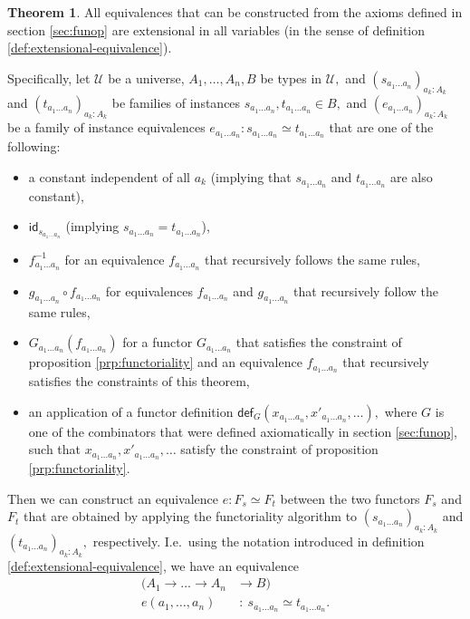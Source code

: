 \documentclass[a4paper]{article}
\theoremstyle{definition}
\newtheorem{theorem}[definition]{Theorem}
\theoremstyle{remark}
\renewcommand{\equiv}{\simeq}
\newcommand{\U}{\mathcal{U}}
\newcommand{\nm}{\mathsf}
\newcommand{\id}{\nm{id}}
\newcommand{\fndef}[1]{\nm{def}_{#1}}
\begin{document}
\begin{theorem}
  \label{thm:extensionality}
  All equivalences that can be constructed from the axioms defined in section \ref{sec:funop}
  are extensional in all variables (in the sense of definition \ref{def:extensional-equivalence}).

  Specifically, let $\U$ be a universe, $A_1,\ldots,A_n,B$ be types in $\U,$ and
  $(s_{a_1 \ldots a_n})_{a_k : A_k}$ and $(t_{a_1 \ldots a_n})_{a_k : A_k}$ be families
  of instances $s_{a_1 \ldots a_n},t_{a_1 \ldots a_n} \in B,$ and
  $(e_{a_1 \ldots a_n})_{a_k : A_k}$ be a family of instance equivalences
  $e_{a_1 \ldots a_n} : s_{a_1 \ldots a_n} \equiv t_{a_1 \ldots a_n}$ that are one of the
  following:
  \begin{itemize}
    \item a constant independent of all $a_k$ (implying that $s_{a_1 \ldots a_n}$ and
    $t_{a_1 \ldots a_n}$ are also constant),
    \item $\id_{s_{a_1 \ldots a_n}}$ (implying $s_{a_1 \ldots a_n} = t_{a_1 \ldots a_n}$),
    \item $f_{a_1 \ldots a_n}^{-1}$ for an equivalence $f_{a_1 \ldots a_n}$ that recursively
    follows the same rules,
    \item $g_{a_1 \ldots a_n} \circ f_{a_1 \ldots a_n}$ for equivalences $f_{a_1 \ldots a_n}$
    and $g_{a_1 \ldots a_n}$ that recursively follow the same rules,
    \item $G_{a_1 \ldots a_n}(f_{a_1 \ldots a_n})$ for a functor $G_{a_1 \ldots a_n}$ that
    satisfies the constraint of proposition \ref{prp:functoriality} and an equivalence
    $f_{a_1 \ldots a_n}$ that recursively satisfies the constraints of this theorem,
    \item an application of a functor definition
    $\fndef{G}(x_{a_1 \ldots a_n},x'_{a_1 \ldots a_n},\ldots),$ where $G$ is one of the
    combinators that were defined axiomatically in section \ref{sec:funop}, such that
    $x_{a_1 \ldots a_n},x'_{a_1 \ldots a_n},\ldots$ satisfy the constraint of proposition
    \ref{prp:functoriality}.
  \end{itemize}

  Then we can construct an equivalence $e : F_s \equiv F_t$ between the two functors $F_s$
  and $F_t$ that are obtained by applying the functoriality algorithm to
  $(s_{a_1 \ldots a_n})_{a_k : A_k}$ and $(t_{a_1 \ldots a_n})_{a_k : A_k},$ respectively.
  I.e.\ using the notation introduced in definition \ref{def:extensional-equivalence}, we
  have an equivalence
  \begin{align*}
    (A_1 \to \dots \to A_n &\to   B)\\
    e(a_1,\ldots,a_n)      &\ :\  s_{a_1 \ldots a_n} \equiv t_{a_1 \ldots a_n}.
  \end{align*}
\end{theorem}
\end{document}
